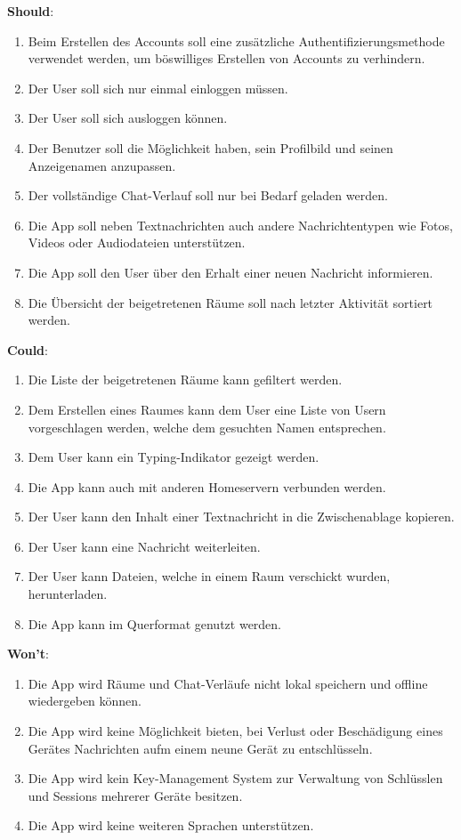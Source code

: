     \textbf{Should}:
    \begin{enumerate}[label={\roman*.}, leftmargin=2.5cm]
        \item Beim Erstellen des Accounts soll eine zusätzliche Authentifizierungsmethode verwendet werden, um böswilliges Erstellen von Accounts zu verhindern.
        \item Der User soll sich nur einmal einloggen müssen.
        \item Der User soll sich ausloggen können.
        \item Der Benutzer soll die Möglichkeit haben, sein Profilbild und seinen Anzeigenamen anzupassen.
        \item Der vollständige Chat-Verlauf soll nur bei Bedarf geladen werden.
        \item Die App soll neben Textnachrichten auch andere Nachrichtentypen wie Fotos, Videos oder Audiodateien unterstützen.
        \item Die App soll den User über den Erhalt einer neuen Nachricht informieren.
        \item Die Übersicht der beigetretenen Räume soll nach letzter Aktivität sortiert werden.
    \end{enumerate}


    \textbf{Could}:
    \begin{enumerate}[label={\roman*.}, leftmargin=2.5cm]
        \item Die Liste der beigetretenen Räume kann gefiltert werden.
        \item Dem Erstellen eines Raumes kann dem User eine Liste von Usern vorgeschlagen werden, welche dem gesuchten Namen entsprechen.
        \item Dem User kann ein Typing-Indikator gezeigt werden.
        \item Die App kann auch mit anderen Homeservern verbunden werden.
        \item Der User kann den Inhalt einer Textnachricht in die Zwischenablage kopieren.
        \item Der User kann eine Nachricht weiterleiten.
        \item Der User kann Dateien, welche in einem Raum verschickt wurden, herunterladen.
        \item Die App kann im Querformat genutzt werden.
    \end{enumerate}

    \textbf{Won't}:
    \begin{enumerate}[label={\roman*.}, leftmargin=2.5cm]
        \item Die App wird Räume und Chat-Verläufe nicht lokal speichern und offline wiedergeben können.
        \item Die App wird keine Möglichkeit bieten, bei Verlust oder Beschädigung eines Gerätes Nachrichten aufm einem neune Gerät zu entschlüsseln.
        \item Die App wird kein Key-Management System zur Verwaltung von Schlüsslen und Sessions mehrerer Geräte besitzen.
        \item Die App wird keine weiteren Sprachen unterstützen.
    \end{enumerate}


